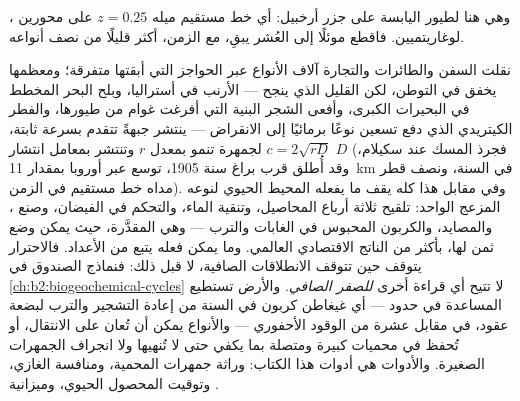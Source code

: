 \begin{omfigure}

{\small {}، وهي هنا لطيور اليابسة على جزر
أرخبيل: أي خط مستقيم ميله $z = 0.25$ على
محورين لوغاريتميين. فاقطع موئلًا إلى العُشر يبقِ، مع الزمن،
أكثر قليلًا من نصف أنواعه.}
\end{omfigure}

\begin{proposition}\label{prop:b2:global-change:invasion}
نقلت السفن والطائرات والتجارة آلاف الأنواع عبر
الحواجز التي أبقتها متفرقة؛ ومعظمها يخفق في التوطن، لكن
القليل الذي ينجح --- الأرنب في أستراليا، وبلح البحر المخطط في
البحيرات الكبرى، وأفعى الشجر البنية التي أفرغت غوام من طيورها،
والفطر الكيتريدي الذي دفع تسعين نوعًا برمائيًا إلى
الانقراض --- ينتشر جبهةً تتقدم بسرعة ثابتة، $c =
2\sqrt{rD}$ لجمهرة تنمو بمعدل $r$ وتنتشر
بمعامل انتشار $D$ (فجرذ المسك عند سكيلام، وقد أُطلق قرب
براغ سنة 1905، توسع عبر أوروبا بمقدار \qty{11}{km} في السنة،
ونصف قطر مداه خط مستقيم في الزمن). وفي مقابل هذا كله يقف
ما يفعله المحيط الحيوي لنوعه المزعج الواحد:
تلقيح ثلاثة أرباع المحاصيل، وتنقية الماء، والتحكم
في الفيضان،  وصنع ، والمصايد،
والكربون المحبوس في الغابات والترب --- وهي \emph{}
المقدَّرة، حيث يمكن وضع ثمن لها، بأكثر من الناتج
الاقتصادي العالمي. وما يمكن فعله يتبع من الأعداد.
فالاحترار يتوقف حين تتوقف الانطلاقات الصافية، لا قبل ذلك: فنماذج
الصندوق في \cref{ch:b2:biogeochemical-cycles} لا تتيح أي قراءة
أخرى \emph{للصفر الصافي}. والأرض تستطيع المساعدة في حدود --- أي
غيغاطن كربون في السنة من إعادة التشجير والترب لبضعة
عقود، في مقابل عشرة من الوقود الأحفوري --- والأنواع يمكن أن
تُعان على الانتقال، أو تُحفظ في محميات كبيرة ومتصلة بما يكفي
حتى لا تُنهيها  ولا انجراف الجمهرات
الصغيرة. والأدوات هي أدوات هذا الكتاب:
وراثة جمهرات المحمية، ومنافسة الغازي،
وتوقيت المحصول الحيوي، وميزانية .
\end{proposition}

